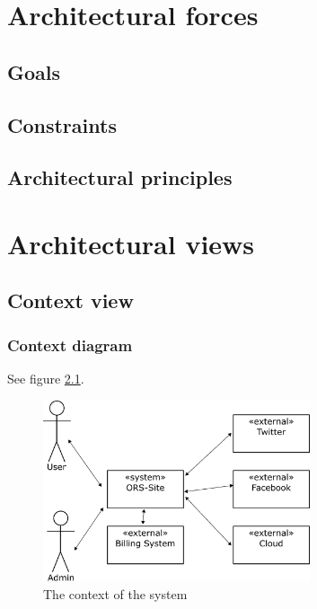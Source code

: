 \documentclass[a4paper,11pt]{report}
\begin{document}
\chapter{Architectural forces}
\label{cha:architectural-forces}
\thispagestyle{fancy}

\section{Goals}
\label{sec:goals}


\section{Constraints}
\label{sec:constraints}

\section{Architectural principles}
\label{sec:arch-princ}


\chapter{Architectural views}
\label{cha:architectural-views}
\thispagestyle{fancy}

\section{Context view}
\label{sec:context-view}



\subsection{Context diagram}
\label{sec:context-diagram}

See figure \ref{fig:context}.

\begin{figure}[h!]
  \centering
  \includegraphics[width=0.7\textwidth]{figures/context_drawing}
  \caption{The context of the system}
  \label{fig:context}
\end{figure}
\end{document}
